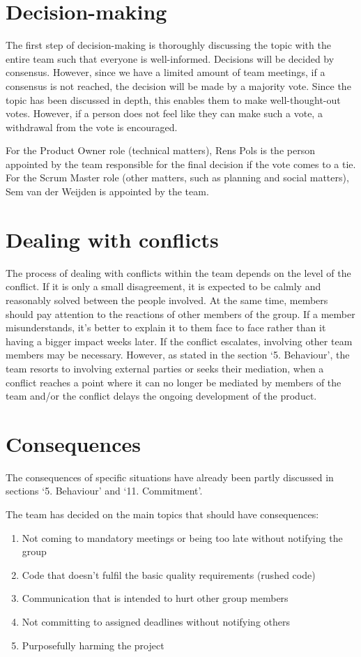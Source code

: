 \documentclass[sigconf,nonacm]{acmart}
\begin{document}
\section{Decision-making}
The first step of decision-making is thoroughly discussing the topic with the entire team such that everyone is well-informed. Decisions will be decided by consensus. However, since we have a limited amount of team meetings, if a consensus is not reached, the decision will be made by a majority vote. Since the topic has been discussed in depth, this enables them to make well-thought-out votes. However, if a person does not feel like they can make such a vote, a withdrawal from the vote is encouraged.

For the Product Owner role (technical matters), Rens Pols is the person appointed by the team responsible for the final decision if the vote comes to a tie.
For the Scrum Master role (other matters, such as planning and social matters), Sem van der Weijden is appointed by the team.


\section{Dealing with conflicts}
The process of dealing with conflicts within the team depends on the level of the conflict. If it is only a small disagreement, it is expected to be calmly and reasonably solved between the people involved. At the same time, members should pay attention to the reactions of other members of the group. If a member misunderstands, it's better to explain it to them face to face rather than it having a bigger impact weeks later. If the conflict escalates, involving other team members may be necessary. However, as stated in the section ‘5. Behaviour’, the team resorts to involving external parties or seeks their mediation, when a conflict reaches a point where it can no longer be mediated by members of the team and/or the conflict delays the ongoing development of the product.


\section{Consequences}
The consequences of specific situations have already been partly discussed in sections ‘5. Behaviour’ and ‘11. Commitment’.

The team has decided on the main topics that should have consequences:
\begin{enumerate}
    \item Not coming to mandatory meetings or being too late without notifying the group
    \item Code that doesn’t fulfil the basic quality requirements (rushed code)
    \item Communication that is intended to hurt other group members
    \item Not committing to assigned deadlines without notifying others
    \item Purposefully harming the project
\end{enumerate}
\end{document}
